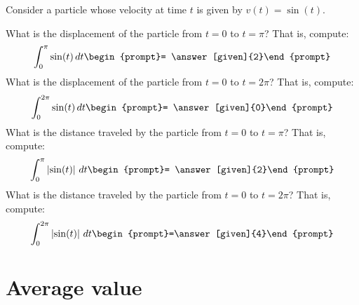 \documentclass{ximera}
\begin{document}
\begin{question}
  Consider a particle whose velocity at time $t$ is given by $v(t) = \sin(t)$.

\begin{image}
\end{image}
What is the displacement of the particle from $t=0$ to $t=\pi$? That
is, compute:
\[
\int_0^\pi \sin(t) \d t \begin{prompt}= \answer[given]{2}\end{prompt}
\]
What is the displacement of the particle from $t=0$ to $t=2\pi$? That is, compute:
\[
\int_0^{2\pi} \sin(t) \d t \begin{prompt}= \answer[given]{0}\end{prompt}
\]
What is the distance traveled by the particle from $t=0$ to $t=\pi$?
That is, compute:
\[
\int_0^\pi  \left| \sin(t) \right|  \d t \begin{prompt}= \answer[given]{2}\end{prompt}
\]
What is the distance traveled by the particle from $t=0$ to $t=2\pi$?
That is, compute:
\[
\int_0^{2\pi} \left| \sin(t) \right| \d t \begin{prompt}=\answer[given]{4}\end{prompt}
\]
\end{question}



\section{Average value}
\end{document}
